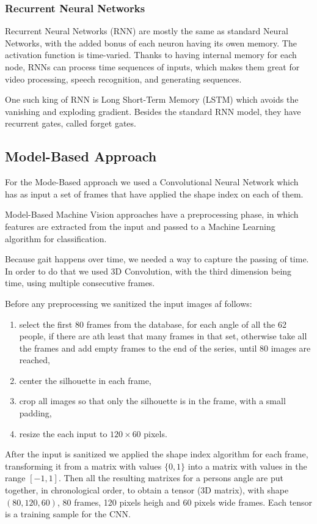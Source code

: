\documentclass[12pt]{article}
\theoremstyle{definition}
\begin{document}
	\subsubsection{Recurrent Neural Networks}

	Recurrent Neural Networks (RNN) are mostly the same as standard Neural Networks, with the added bonus of each neuron having its owen memory. The activation function is time-varied. Thanks to having internal memory for each node, RNNs can process time sequences of inputs, which makes them great for video processing, speech recognition, and generating sequences.

	One such king of RNN is Long Short-Term Memory (LSTM) which avoids the vanishing and exploding gradient. Besides the standard RNN model, they have recurrent gates, called forget gates.


	\subsection{Model-Based Approach}

	For the Mode-Based approach we used a Convolutional Neural Network which has as input a set of frames that have applied the shape index on each of them.

	Model-Based Machine Vision approaches have a preprocessing phase, in which features are extracted from the input and passed to a Machine Learning algorithm for classification.

	Because gait happens over time, we needed a way to capture the passing of time. In order to do that we used 3D Convolution, with the third dimension being time, using multiple consecutive frames.

	Before any preprocessing we sanitized the input images af follows:
	\begin{enumerate}
		\item select the first 80 frames from the database, for each angle of all the 62 people, if there are ath least that many frames in that set, otherwise take all the frames and add empty frames to the end of the series, until 80 images are reached,
		\item center the silhouette in each frame,
		\item crop all images so that only the silhouette is in the frame, with a small padding,
		\item resize the each input to $120 \times 60$ pixels.
	\end{enumerate}

	After the input is sanitized we applied the shape index algorithm for each frame, transforming it from a matrix with values $\{0, 1\}$ into a matrix with values in the range $[-1, 1]$. Then all the resulting matrixes for a persons angle are put together, in chronological order, to obtain a tensor (3D matrix), with shape $(80, 120, 60)$, 80 frames, 120 pixels heigh and 60 pixels wide frames. Each tensor is a training sample for the CNN.
\end{document}

